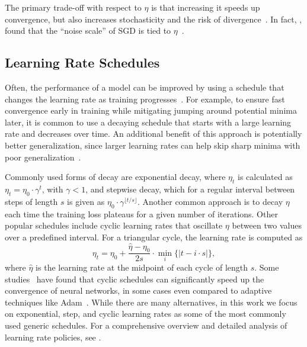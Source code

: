 \documentclass[runningheads]{llncs}
\begin{document}
The primary trade-off with respect to $\eta$ is that increasing it speeds up convergence, but also increases stochasticity and the risk of divergence~\cite{bengioPracticalRecommendationsGradientbased2012}.
In fact, \textcite{smithBayesianPerspectiveGeneralization2018}, found that the “noise scale” of SGD is tied to $\eta$~\cite{smithBayesianPerspectiveGeneralization2018}.

\subsection{Learning Rate Schedules}

Often, the performance of a model can be improved by using a schedule that changes the learning rate as training progresses~\cite{wuDemystifyingLearningRate2019b}.
For example, to ensure fast convergence early in training while mitigating jumping around potential minima later, it is common to use a decaying schedule that starts with a large learning rate and decreases over time.
An additional benefit of this approach is potentially better generalization, since larger learning rates can help skip sharp minima with poor generalization~\cite{hochreiterFlatMinima1997,chaudhariEntropySGDBiasingGradient2017}.

Commonly used forms of decay are exponential decay, where $\eta_{t}$ is calculated as
$\eta_{t} = \eta_0 \cdot \gamma^t$,
with $\gamma < 1$, and stepwise decay, which for a regular interval between steps of length $s$ is given as $\eta_0 \cdot \gamma^{\lfloor t/s \rfloor}$.
Another common approach is to decay $\eta$ each time the training loss plateaus for a given number of iterations. Other popular schedules include cyclic learning rates that oscillate $\eta$ between two values over a predefined interval.
For a triangular cycle, the learning rate is computed as
\begin{equation}
	\eta_t = \eta_0 + \frac{\hat{\eta} - \eta_0}{2s} \cdot \min_{i} \{|t-i\cdot s|\},
\end{equation}
where $\hat{\eta}$ is the learning rate at the midpoint of each cycle of length $s$.
Some studies~\cite{smithCyclicalLearningRates2017, smithSuperConvergenceVeryFast2018a} have found that cyclic schedules can significantly speed up the convergence of neural networks, in some cases even compared to adaptive techniques like Adam~\cite{kingmaAdamMethodStochastic2017b}.
While there are many alternatives, in this work we focus on exponential, step, and cyclic learning rates as some of the most commonly used generic schedules.
For a comprehensive overview and detailed analysis of learning rate policies, see \textcite{wuDemystifyingLearningRate2019b}.
\end{document}

